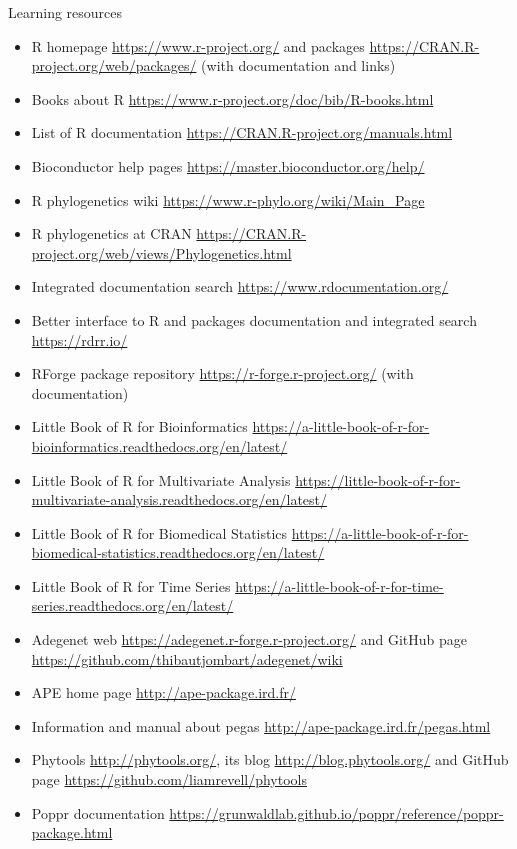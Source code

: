 \documentclass[compress, ucs, xelatex, 11pt, xcolor=svgnames, aspectratio=169,
	hyperref={
		bookmarks=true,
		unicode=true,
		colorlinks=true,
		pdftitle={Molecular data in R},
		plainpages=false,
		pdfauthor={Vojtech Zeisek},
		pdfsubject={Course about phylogeny and evolution in R},
		pdfcreator={XeLaTeX},
		pdfkeywords={R, evolution, phylogeny, molecular data},
		linkcolor=Crimson, %
		anchorcolor=Magenta, %
		citecolor=Magenta, %
		filecolor=Magenta, %
		menucolor=Magenta, %
		urlcolor=DodgerBlue, %
		pdftex},
	url={hyphens, lowtilde} %
	]{beamer}
\begin{document}
\begin{frame}[allowframebreaks]{Learning resources}
	\begin{itemize}
		\item R homepage \url{https://www.r-project.org/} and packages \url{https://CRAN.R-project.org/web/packages/} (with documentation and links)
		\item Books about R \url{https://www.r-project.org/doc/bib/R-books.html}
		\item List of R documentation \url{https://CRAN.R-project.org/manuals.html}
		\item Bioconductor help pages \url{https://master.bioconductor.org/help/}
		\item R phylogenetics wiki \url{https://www.r-phylo.org/wiki/Main_Page}
		\item R phylogenetics at CRAN \url{https://CRAN.R-project.org/web/views/Phylogenetics.html}
		\item Integrated documentation search \url{https://www.rdocumentation.org/}
		\item Better interface to R and packages documentation and integrated search \url{https://rdrr.io/}
		\item RForge package repository \url{https://r-forge.r-project.org/} (with documentation)
		\item Little Book of R for Bioinformatics \url{https://a-little-book-of-r-for-bioinformatics.readthedocs.org/en/latest/}
		\item Little Book of R for Multivariate Analysis \url{https://little-book-of-r-for-multivariate-analysis.readthedocs.org/en/latest/}
		\item Little Book of R for Biomedical Statistics \url{https://a-little-book-of-r-for-biomedical-statistics.readthedocs.org/en/latest/}
		\item Little Book of R for Time Series \url{https://a-little-book-of-r-for-time-series.readthedocs.org/en/latest/}
		\item Adegenet web \url{https://adegenet.r-forge.r-project.org/} and GitHub page \url{https://github.com/thibautjombart/adegenet/wiki}
		\item APE home page \url{http://ape-package.ird.fr/}
		\item Information and manual about pegas \url{http://ape-package.ird.fr/pegas.html}
		\item Phytools \url{http://phytools.org/}, its blog \url{http://blog.phytools.org/} and GitHub page \url{https://github.com/liamrevell/phytools}
		\item Poppr documentation \url{https://grunwaldlab.github.io/poppr/reference/poppr-package.html}

\end{itemize}
\end{frame}
\end{document}
